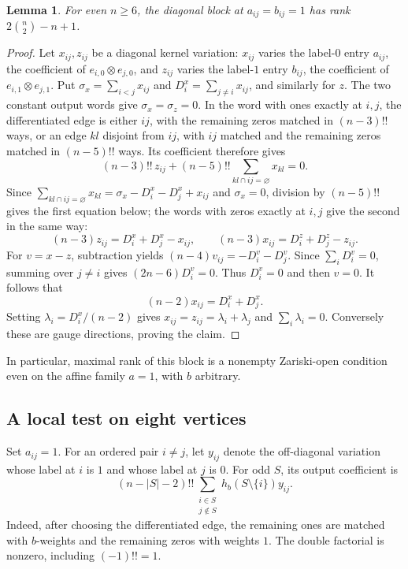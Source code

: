 \documentclass[11pt]{article}
\newtheorem{lemma}[theorem]{Lemma}
\theoremstyle{remark}\newtheorem{remark}[theorem]{Remark}
\begin{document}
\begin{lemma}\label{lem:qubit-diagonal}
For even $n\geq6$, the diagonal block at $a_{ij}=b_{ij}=1$ has rank
$2\binom n2-n+1$.
\end{lemma}
\begin{proof}
Let $x_{ij},z_{ij}$ be a diagonal kernel variation: $x_{ij}$ varies the
label-$0$ entry $a_{ij}$, the coefficient of $e_{i,0}\otimes e_{j,0}$,
and $z_{ij}$ varies the label-$1$ entry $b_{ij}$, the coefficient of
$e_{i,1}\otimes e_{j,1}$. Put $\sigma_x=\sum_{i<j}x_{ij}$ and
$D_i^x=\sum_{j\ne i}x_{ij}$, and similarly for $z$. The two constant
output words give $\sigma_x=\sigma_z=0$.
In the word with ones exactly at $i,j$, the differentiated edge is
either $ij$, with the remaining zeros matched in $(n-3)!!$ ways, or an
edge $kl$ disjoint from $ij$, with $ij$ matched and the remaining zeros
matched in $(n-5)!!$ ways. Its coefficient therefore gives
\[
 (n-3)!!\,z_{ij}+(n-5)!!\sum_{kl\cap ij=\varnothing}x_{kl}=0.
\]
Since $\sum_{kl\cap ij=\varnothing}x_{kl}=\sigma_x-D_i^x-D_j^x+x_{ij}$
and $\sigma_x=0$, division by $(n-5)!!$ gives the first equation below;
the words with zeros exactly at $i,j$ give the second in the same way:
\[
 (n-3)z_{ij}=D_i^x+D_j^x-x_{ij},\qquad
 (n-3)x_{ij}=D_i^z+D_j^z-z_{ij}.
\]
For $v=x-z$, subtraction yields
$(n-4)v_{ij}=-D_i^v-D_j^v$. Since $\sum_iD_i^v=0$, summing over
$j\ne i$ gives $(2n-6)D_i^v=0$. Thus $D_i^v=0$ and then $v=0$.
It follows that
\[
 (n-2)x_{ij}=D_i^x+D_j^x.
\]
Setting $\lambda_i=D_i^x/(n-2)$ gives
$x_{ij}=z_{ij}=\lambda_i+\lambda_j$ and $\sum_i\lambda_i=0$.
Conversely these are gauge directions, proving the claim.
\end{proof}

In particular, maximal rank of this block is a nonempty Zariski-open
condition even on the affine family $a=1$, with $b$ arbitrary.

\subsection{A local test on eight vertices}
Set $a_{ij}=1$. For an ordered pair $i\ne j$, let $y_{ij}$ denote the
off-diagonal variation whose label at $i$ is $1$ and whose label at $j$
is $0$. For odd $S$, its output coefficient is
\begin{equation}\label{eq:qubit-odd}
 (n-|S|-2)!!
 \sum_{\substack{i\in S\\j\notin S}}h_b(S\setminus\{i\})y_{ij}.
\end{equation}
Indeed, after choosing the differentiated edge, the remaining ones
are matched with $b$-weights and the remaining zeros with weights $1$.
The double factorial is nonzero, including $(-1)!!=1$.
\end{document}
